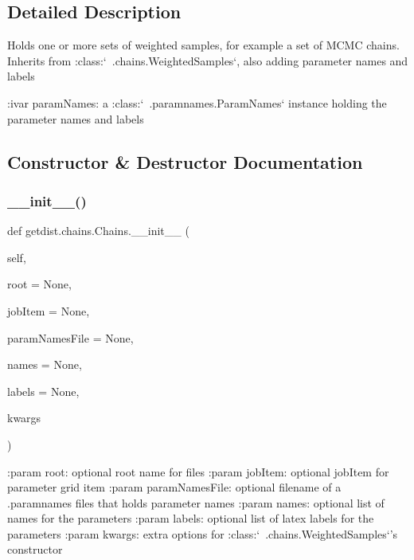 \subsection{Detailed Description}
\begin{DoxyVerb}Holds one or more sets of weighted samples, for example a set of MCMC chains. 
Inherits from :class:`~.chains.WeightedSamples`, also adding parameter names and labels

:ivar paramNames: a :class:`~.paramnames.ParamNames` instance holding the parameter names and labels
\end{DoxyVerb}
 

\subsection{Constructor \& Destructor Documentation}
\mbox{\label{classgetdist_1_1chains_1_1Chains_af5c083e16efd5ecd1d6d41ecae4e6180}} 
\subsubsection{\texorpdfstring{\+\_\+\+\_\+init\+\_\+\+\_\+()}{\_\_init\_\_()}}
{\footnotesize\ttfamily def getdist.\+chains.\+Chains.\+\_\+\+\_\+init\+\_\+\+\_\+ (\begin{DoxyParamCaption}\item[{}]{self,  }\item[{}]{root = {\ttfamily None},  }\item[{}]{job\+Item = {\ttfamily None},  }\item[{}]{param\+Names\+File = {\ttfamily None},  }\item[{}]{names = {\ttfamily None},  }\item[{}]{labels = {\ttfamily None},  }\item[{}]{kwargs }\end{DoxyParamCaption})}

\begin{DoxyVerb}:param root: optional root name for files
:param jobItem: optional jobItem for parameter grid item
:param paramNamesFile: optional filename of a .paramnames files that holds parameter names
:param names: optional list of names for the parameters
:param labels: optional list of latex labels for the parameters
:param kwargs: extra options for :class:`~.chains.WeightedSamples`'s constructor\end{DoxyVerb}
 

